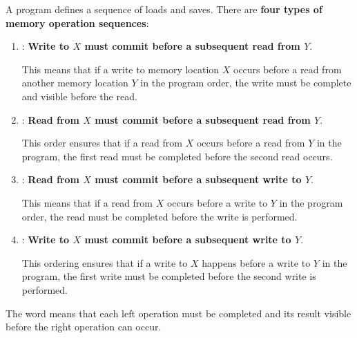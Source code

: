 \begin{flushleft}
\end{flushleft}
A program defines a sequence of loads and saves. There are \textbf{four types of memory operation sequences}:
\begin{enumerate}
    \item {}: \textbf{Write to $X$ must commit before a subsequent read from $Y$}.

    This means that if a write to memory location $X$ occurs before a read from another memory location $Y$ in the program order, the write must be complete and visible before the read.


    \item {}: \textbf{Read from $X$ must commit before a subsequent read from $Y$}.
   
    This order ensures that if a read from $X$ occurs before a read from $Y$ in the program, the first read must be completed before the second read occurs.


    \item {}: \textbf{Read from $X$ must commit before a subsequent write to $Y$}.
   
    This means that if a read from $X$ occurs before a write to $Y$ in the program order, the read must be completed before the write is performed.


    \item {}: \textbf{Write to $X$ must commit before a subsequent write to $Y$}.
   
    This ordering ensures that if a write to $X$ happens before a write to $Y$ in the program, the first write must be completed before the second write is performed.
\end{enumerate}
The word  means that each left operation must be completed and its result visible before the right operation can occur.
